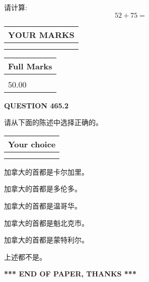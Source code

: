 \documentclass{ctexart}
\begin{document}
  
 
请计算:
\begin{equation}
52 +  %
75 = \nonumber
\end{equation}
 

 

 
  
\vspace{0.2in}
  
\noindent\begin{tabular}{|l|}
\hline
 YOUR MARKS  \\
\hline
 \\ 
 \\ 
\hline
\end{tabular}
\hspace{0.05in} \begin{tabular}{|l|}
\hline
 Full Marks  \\
\hline
 \\ 
50.00 \\
\hline
\end{tabular}
{\textbf{\Large{QUESTION
465.2 
}}}
  
  
请从下面的陈述中选择正确的。
  
  
\noindent\hspace{3.0in} \begin{tabular}{|l|}
\hline
Your choice \\
\hline
 \\ 
 \\ 
\hline
\end{tabular}
  
  
 
 
加拿大的首都是卡尔加里。
 
 
加拿大的首都是多伦多。
 
 
加拿大的首都是温哥华。
 
 
加拿大的首都是魁北克市。
 
 
加拿大的首都是蒙特利尔。
 
 
 上述都不是。
 
 
   
   
 \vspace{0.2in}
 
   
   
   
   
\vspace{1.0in} 
{\textbf{\large{ *** END OF PAPER, THANKS *** }}} 
   
\end{document}
